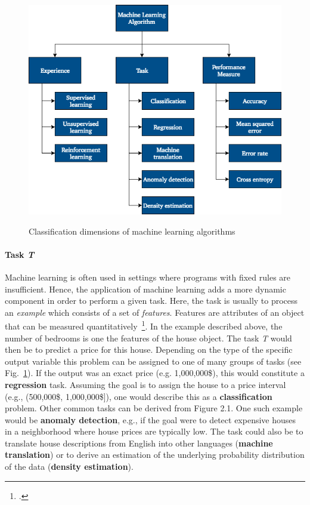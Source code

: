 \begin{figure}[h]
  \centering
  \includegraphics[height=10cm]{img/ml_classification}
  \caption{Classification dimensions of machine learning algorithms}
\label{fig:ml_classification}
\end{figure}

\paragraph{Task \textit{T}}

Machine learning is often used in settings where programs with fixed rules are
insufficient. Hence, the application of machine learning adds a more dynamic
component in order to perform a given task. Here, the task is usually to process
an \textit{example} which consists of a set of \textit{features}. Features are
attributes of an object that can be measured quantitatively~\footcite{Goodfellow2016}. 
In the example described above, the number of bedrooms is one the features of 
the house object. The task \textit{T} would then be to predict a price for this 
house. Depending on the type of the specific output variable this problem can 
be assigned to one of many groups of tasks (see Fig.~\ref{fig:ml_classification}). If the output was an
exact price (e.g. 1,000,000\$), this would constitute a \textbf{regression} task. 
Assuming the goal is to assign the house to a price interval (e.g., (500,000\$, 1,000,000\$]),
one would describe this as a \textbf{classification} problem. Other common tasks
can be derived from Figure 2.1. One such example would be \textbf{anomaly detection}, e.g.,
if the goal were to detect expensive houses in a neighborhood where house prices
are typically low. The task could also be to translate house descriptions from
English into other languages (\textbf{machine translation}) or to derive an
estimation of the underlying probability distribution of the data (\textbf{density estimation}).

